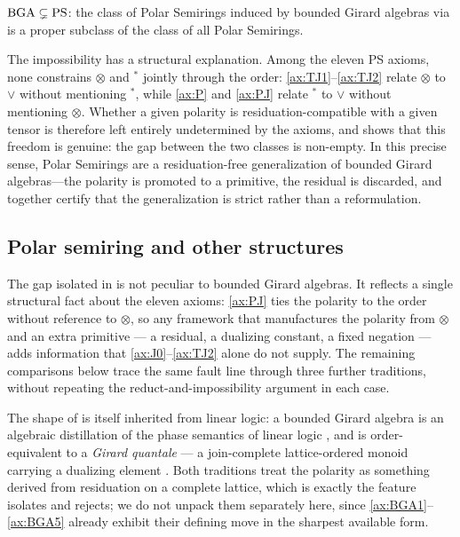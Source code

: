 \begin{corollary}\label{cor:strict}
$\mathrm{BGA} \subsetneq \mathrm{PS}$: the class of Polar Semirings induced by bounded
Girard algebras via  is a proper subclass of the
class of all Polar Semirings.
\end{corollary}

\begin{remark}\label{rem:why-impossible}
The impossibility has a structural explanation. Among the eleven PS axioms,
none constrains $\otimes$ and ${}^{*}$ jointly through the order:
\eqref{ax:TJ1}--\eqref{ax:TJ2} relate $\otimes$ to $\vee$ without
mentioning ${}^{*}$, while \eqref{ax:P} and \eqref{ax:PJ} relate ${}^{*}$
to $\vee$ without mentioning $\otimes$. Whether a given polarity is
residuation-compatible with a given tensor is therefore left entirely
undetermined by the axioms, and  shows that this
freedom is genuine: the gap between the two classes is non-empty. In this
precise sense, Polar Semirings are a residuation-free generalization of
bounded Girard algebras---the polarity is promoted to a primitive, the
residual is discarded, and 
together certify that the generalization is strict rather than a
reformulation.
\end{remark}

\subsection{Polar semiring and other structures}
\label{subsec:related-structures}

The gap isolated in  is not
peculiar to bounded Girard algebras. It reflects a single structural fact
about the eleven axioms: \eqref{ax:PJ} ties the polarity to the order
without reference to $\otimes$, so any framework that manufactures the
polarity from $\otimes$ and an extra primitive --- a residual, a
dualizing constant, a fixed negation --- adds information that
\eqref{ax:J0}--\eqref{ax:TJ2} alone do not supply. The remaining
comparisons below trace the same fault line through three further
traditions, without repeating the reduct-and-impossibility argument in
each case.

The shape of  is itself inherited from linear logic: a
bounded Girard algebra is an algebraic distillation of the phase
semantics of linear logic , and is order-equivalent to a
\emph{Girard quantale} --- a join-complete lattice-ordered monoid carrying
a dualizing element . Both traditions treat
the polarity as something derived from residuation on a complete lattice,
which is exactly the feature  isolates and rejects;
we do not unpack them separately here, since \eqref{ax:BGA1}--\eqref{ax:BGA5}
already exhibit their defining move in the sharpest available form.

